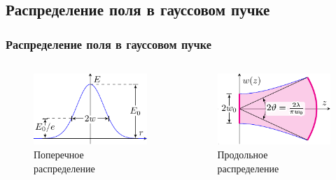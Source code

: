 \subsection{Распределение поля в гауссовом пучке}
\begin{frame}[c]%
	\frametitle{Распределение поля в гауссовом пучке}
	\vspace{-1em}
	\begin{columns}[t]
		\begin{column}{0.49\textwidth}%
			\begin{figure}[h]
				\includegraphics[width=0.86\linewidth]{ris/E}
				\caption{Поперечное распределение}
			\end{figure}
		\end{column}
		\begin{column}{0.49\textwidth}%
			\begin{figure}[h]
				\includegraphics[width=0.86\linewidth]{ris/w}
				\caption{Продольное распределение }
			\end{figure}


\end{column}
\end{columns}
\end{frame}
